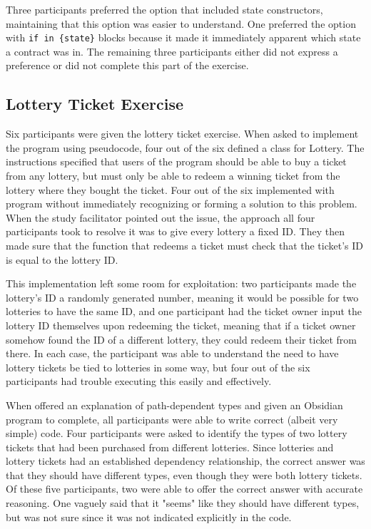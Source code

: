 \documentclass[sigplan,10pt,review]{acmart}\settopmatter{printfolios=true}
\begin{document}
Three participants preferred the option that included state constructors, maintaining that this option was easier to understand. One preferred the option with \texttt{\small{if in \{state\}}} blocks because it made it immediately apparent which state a contract was in. The remaining three participants either did not express a preference or did not complete this part of the exercise. 

\subsection{Lottery Ticket Exercise}	
	
Six participants were given the lottery ticket exercise. When asked to implement the program using pseudocode, four out of the six defined 
a class for Lottery. The instructions specified that users of the program should be able to buy a ticket from any lottery, but must only be 
able to redeem a winning ticket from the lottery where they bought the ticket. Four out of the six implemented with program without 
immediately recognizing or forming a solution to this problem. When the study facilitator pointed out the issue, the approach all four 
participants took to resolve it was to give every lottery a fixed ID. They then made sure that the function that redeems a ticket must check 
that the ticket's ID is equal to the lottery ID. 

This implementation left some room for exploitation: two participants made the lottery's ID a randomly generated number, meaning it would be 
possible for two lotteries to have the same ID, and one  participant had the ticket owner input the lottery ID themselves upon redeeming 
the ticket, meaning that if a ticket owner somehow found the ID of a different lottery, they could redeem their ticket from there.
In each case, the participant was able to understand the need to have lottery tickets be tied to 
lotteries in some way, but four out of the six participants had trouble executing this easily and effectively. 

When offered an explanation of path-dependent types and given an Obsidian program to complete, all participants were able to write 
correct (albeit very simple) code. Four participants were asked to identify the types of two lottery tickets that had been purchased from different 
lotteries. Since lotteries and lottery tickets had an established dependency relationship, the correct answer was that they should have different 
types, even though they were both lottery tickets. Of these five participants, two were able to offer the correct answer with accurate reasoning. 
One vaguely said that it "seems" like they should have different types, but was not sure since it was not indicated explicitly in the code. 
\end{document}

